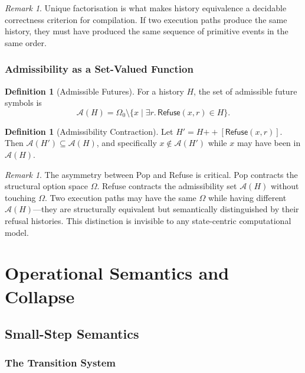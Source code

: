 \documentclass[12pt, a4paper, openany]{book}
\theoremstyle{plain}
\theoremstyle{definition}
\newtheorem{definition}[theorem]{Definition}
\theoremstyle{remark}
\newtheorem{remark}[theorem]{Remark}
\newcommand{\Refuse}{\mathsf{Refuse}}
\newcommand{\calA}{\mathcal{A}}
\begin{document}
\begin{remark}
Unique factorisation is what makes history equivalence a decidable correctness
criterion for compilation. If two execution paths produce the same history, they
must have produced the same sequence of primitive events in the same order.
\end{remark}

\section{Admissibility as a Set-Valued Function}
\label{sec:admissibility-set}

\begin{definition}[Admissible Futures]
For a history $H$, the set of admissible future symbols is
\[
\calA(H) = \Omega_0 \setminus \{x \mid \exists r.\, \Refuse(x, r) \in H\}.
\]
\end{definition}

\begin{definition}[Admissibility Contraction]
Let $H' = H \mathbin{++} [\Refuse(x, r)]$. Then $\calA(H') \subseteq \calA(H)$,
and specifically $x \notin \calA(H')$ while $x$ may have been in $\calA(H)$.
\end{definition}

\begin{remark}
The asymmetry between Pop and Refuse is critical. Pop contracts the structural
option space $\Omega$. Refuse contracts the admissibility set $\calA(H)$ without
touching $\Omega$. Two execution paths may have the same $\Omega$ while having
different $\calA(H)$---they are structurally equivalent but semantically
distinguished by their refusal histories. This distinction is invisible to any
state-centric computational model.
\end{remark}

\part{Operational Semantics and Collapse}

\chapter{Small-Step Semantics}

\section{The Transition System}
\end{document}
